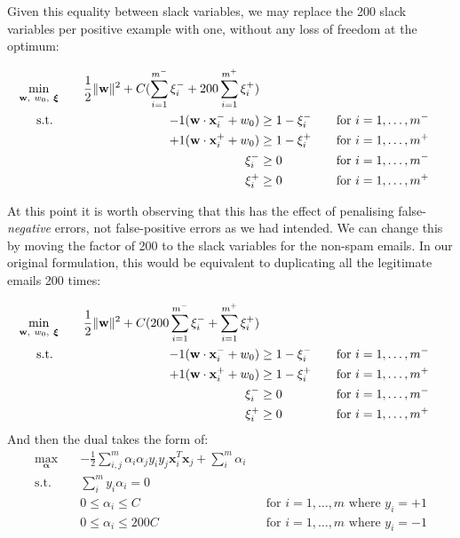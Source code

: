Given this equality between slack variables, we may replace the 200 slack variables per positive example with one, without any loss of freedom at the optimum:

\begin{alignat*}{3}
  \min_{\mathbf{w},~w_0,~\boldsymbol\xi}\quad&&\frac{1}{2}\lVert\mathbf{w}\rVert^2 + C(\sum_{i=1}^{m^-}\xi_i^-+200\sum_{i=1}^{m^+}\xi_i^+)\\
  \text{s.t. }\quad&&-1(\mathbf{w}\cdot\mathbf{x}_i^-+w_0) & \geq 1 - \xi_i^- &&\quad\text{for }i = 1,\ldots,m^-
  \\ &&+1(\mathbf{w}\cdot\mathbf{x}_i^++w_0) & \geq 1 - \xi_i^+ &&\quad\text{for }i = 1,\ldots,m^+
  \\ &&\xi_i^- & \geq 0 &&\quad\text{for }i=1,\ldots,m^-
  \\ &&\xi_i^+ & \geq 0 &&\quad\text{for }i=1,\ldots,m^+
\end{alignat*}

At this point it is worth observing that this has the effect of penalising false-\textit{negative} errors, not false-positive errors as we had intended. We can change this by moving the factor of 200 to the slack variables for the non-spam emails. In our original formulation, this would be equivalent to duplicating all the legitimate emails 200 times:

\begin{alignat*}{3}
  \min_{\mathbf{w},~w_0,~\boldsymbol\xi}\quad&&\frac{1}{2}\lVert\mathbf{w}\rVert^2 + C(200\sum_{i=1}^{m^-}\xi_i^-+\sum_{i=1}^{m^+}\xi_i^+)\\
  \text{s.t. }\quad&&-1(\mathbf{w}\cdot\mathbf{x}_i^-+w_0) & \geq 1 - \xi_i^- &&\quad\text{for }i = 1,\ldots,m^-
  \\ &&+1(\mathbf{w}\cdot\mathbf{x}_i^++w_0) & \geq 1 - \xi_i^+ &&\quad\text{for }i = 1,\ldots,m^+
  \\ &&\xi_i^- & \geq 0 &&\quad\text{for }i=1,\ldots,m^-
  \\ &&\xi_i^+ & \geq 0 &&\quad\text{for }i=1,\ldots,m^+
\end{alignat*}
\noindent And then the dual takes the form of:
\begin{align*}
  \max_{\boldsymbol\alpha}\quad&-\frac{1}{2}\sum_{i,j}^{m}\alpha_i\alpha_jy_iy_j\mathbf{x}_i^T\mathbf{x}_j+\sum_{i}^m\alpha_i \\
  \text{s.t.}\quad&\sum_i^my_i\alpha_i = 0
  \\ & 0\leq\alpha_i\leq C && \text{for }i=1,\ldots,m\text{ where }y_i=+1
  \\ & 0\leq\alpha_i\leq 200C &&\text{for }i=1,\ldots,m\text{ where }y_i=-1
\end{align*}

